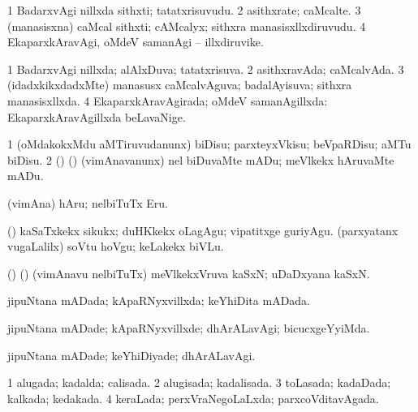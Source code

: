 {{\bentry
{} 
\gl{\nA}
\expl{}
\bmng
\bnum
\num{1} BadarxvAgi nillxda sithxti; tatatxrisuvudu. 
\num{2} asithxrate; caMcalte. 
\num{3} (manasisxna) caMcal sithxti; cAMcalyx; sithxra manasisxllxdiruvudu. 
\num{4} EkaparxkAravAgi, oMdeV samanAgi -- illxdiruvike. 
\enum
\emng
\eentry

\bentry
{} 
\gl{\gu}
\bmng
\bnum
\num{1} BadarxvAgi nillxda; alAlxDuva; tatatxrisuva. 
\num{2} asithxravAda; caMcalvAda. 
\num{3} (idadxkikxdadxMte) manasusx caMcalvAguva; badalAyisuva; sithxra manasisxllxda. 
\num{4} EkaparxkAravAgirada; oMdeV samanAgillxda:  EkaparxkAravAgillxda beLavaNige. 
\enum
\emng
\eentry

\bentry
{} 
\gl{\kirx}

\gl{\sakirx}
\expl{}
\bmng
\bnum
\num{1} (oMdakokxMdu aMTiruvudanunx) biDisu; parxteyxVkisu; beVpaRDisu; aMTu biDisu. 
\num{2} (\vAyA) (\AmA) (vimAnavanunx) nel biDuvaMte mADu; meVlkekx hAruvaMte mADu. 
\enum
\emng

\noindent
\gl{\akirx}
\expl{}
\bmng
(vimAna) hAru; nelbiTuTx Eru. 
\emng

\noindent
\gl{\pagu}
\expl{}
\bmng
{} (\AmA) 
\banum
{} kaSaTxkekx sikukx; duHKkekx oLagAgu; vipatitxge guriyAgu. 
 (parxyatanx \mo vugaLalilx) soVtu hoVgu; keLakekx biVLu. 
\eanum
\emng
\eentry

\bentry
{} 
\gl{\nA}
\expl{}
\bmng
(\vAyA) (\AmA) (vimAnavu nelbiTuTx) meVlkekxVruva kaSxN; uDaDxyana kaSxN. 
\emng
\eentry

\bentry
{} 
\gl{\gu}
\expl{}
\bmng
jipuNtana mADada; kApaRNyxvillxda; keYhiDita mADada. 
\emng
\eentry

\bentry
{} 
\gl{\kirxvi}
\expl{}
\bmng
jipuNtana mADade; kApaRNyxvillxde; dhArALavAgi; bicucxgeYyiMda. 
\emng
\eentry

\bentry
{} 
\gl{\gu}
\expl{}
\bmng
{} 
\emng
\eentry

\bentry
{} 
\gl{\kirxvi}
\bmng
jipuNtana mADade; keYhiDiyade; dhArALavAgi. 
\emng
\eentry

\bentry
{} 
\gl{\gu}
\expl{}
\bmng
\bnum
\num{1} alugada; kadalda; calisada. 
\num{2} alugisada; kadalisada. 
\num{3} toLasada; kadaDada; kalkada; kedakada. 
\num{4} keraLada; perxVraNegoLaLxda; parxcoVditavAgada. 
\enum
\emng
\eentry

}}
